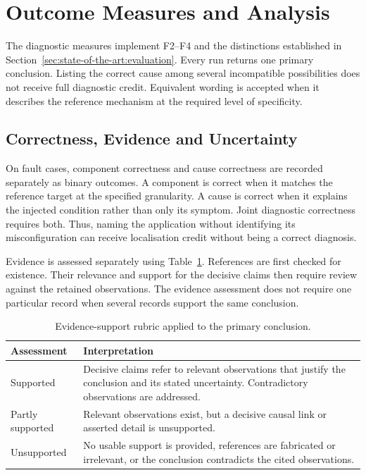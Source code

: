 \section{Outcome Measures and Analysis}
\label{sec:methodology:measures}

The diagnostic measures implement F2--F4 and the distinctions established
in Section~\ref{sec:state-of-the-art:evaluation}. Every run returns one
primary conclusion. Listing the correct cause among several incompatible
possibilities does not receive full diagnostic credit. Equivalent wording
is accepted when it describes the reference mechanism at the required
level of specificity.

\subsection{Correctness, Evidence and Uncertainty}

On fault cases, component correctness and cause correctness are recorded
separately as binary outcomes. A component is correct when it matches
the reference target at the specified granularity. A cause is correct
when it explains the injected condition rather than only its symptom.
Joint diagnostic correctness requires both. Thus, naming the application
without identifying its misconfiguration can receive localisation credit
without being a correct diagnosis.

Evidence is assessed separately using
Table~\ref{tab:methodology:evidence}. References are first checked for
existence. Their relevance and support for the decisive claims then
require review against the retained observations. The evidence assessment
does not require one particular record when several records support the
same conclusion.

\begin{table}[htbp]
\centering\small
\caption{Evidence-support rubric applied to the primary conclusion.}
\label{tab:methodology:evidence}
\begin{tabularx}{\textwidth}{@{}>{\raggedright\arraybackslash}p{}>{\raggedright\arraybackslash}X@{}}
\toprule
Assessment & Interpretation \\
\midrule
Supported & Decisive claims refer to relevant observations that justify the conclusion and its stated uncertainty. Contradictory observations are addressed. \\
\addlinespace
Partly supported & Relevant observations exist, but a decisive causal link or asserted detail is unsupported. \\
\addlinespace
Unsupported & No usable support is provided, references are fabricated or irrelevant, or the conclusion contradicts the cited observations. \\
\bottomrule
\end{tabularx}
\end{table}

